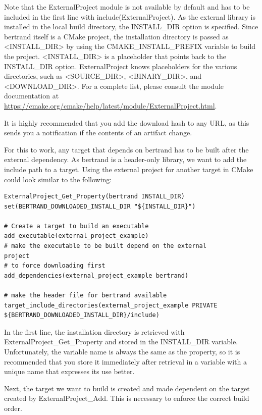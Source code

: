 Note that the ExternalProject module is not available by default and has to be included in the first line with include(ExternalProject). As the external library is installed in the local build directory, the INSTALL\_DIR option is specified. Since bertrand itself is a CMake project, the installation directory is passed as <INSTALL\_DIR> by using the CMAKE\_INSTALL\_PREFIX variable to build the project. <INSTALL\_DIR> is a placeholder that points back to the INSTALL\_DIR option. ExternalProject knows placeholders for the various directories, such as <SOURCE\_DIR>, <BINARY\_DIR>, and <DOWNLOAD\_DIR>. For a complete list, please consult the module documentation at \url{https://cmake.org/cmake/help/latest/module/ExternalProject.html}. 

\begin{tcolorbox}[colback=blue!5!white,colframe=blue!75!black,title=Verify Your Downloads]
It is highly recommended that you add the download hash to any URL, as this sends you a notification if the contents of an artifact change.
\end{tcolorbox}

For this to work, any target that depends on bertrand has to be built after the external dependency. As bertrand is a header-only library, we want to add the include path to a target. Using the external project for another target in CMake could look similar to the following:

\begin{lstlisting}[style=styleCMake]
ExternalProject_Get_Property(bertrand INSTALL_DIR)
set(BERTRAND_DOWNLOADED_INSTALL_DIR "${INSTALL_DIR}")

# Create a target to build an executable
add_executable(external_project_example)
# make the executable to be built depend on the external
project
# to force downloading first
add_dependencies(external_project_example bertrand)

# make the header file for bertrand available
target_include_directories(external_project_example PRIVATE
${BERTRAND_DOWNLOADED_INSTALL_DIR}/include)
\end{lstlisting}

In the first line, the installation directory is retrieved with ExternalProject\_Get\_Property and stored in the INSTALL\_DIR variable. Unfortunately, the variable name is always the same as the property, so it is recommended that you store it immediately after retrieval in a variable with a unique name that expresses its use better.

Next, the target we want to build is created and made dependent on the target created by ExternalProject\_Add. This is necessary to enforce the correct build order.

